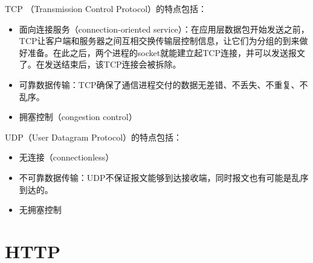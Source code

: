 TCP （Transmission Control Protocol）的特点包括：

\begin{itemize}
    \item 面向连接服务（connection-oriented service）：在应用层数据包开始发送之前，TCP让客户端和服务器之间互相交换传输层控制信息，让它们为分组的到来做好准备。在此之后，两个进程的socket就能建立起TCP连接，并可以发送报文了。在发送结束后，该TCP连接会被拆除。

    \item 可靠数据传输：TCP确保了通信进程交付的数据无差错、不丢失、不重复、不乱序。

    \item 拥塞控制（congestion control）
\end{itemize}

UDP（User Datagram Protocol）的特点包括：

\begin{itemize}
    \item 无连接（connectionless）

    \item 不可靠数据传输：UDP不保证报文能够到达接收端，同时报文也有可能是乱序到达的。

    \item 无拥塞控制
\end{itemize}

\begin{table}[H]
    \centering
    \caption{常见应用传输协议}
\end{table}

\newpage

\section{HTTP}

